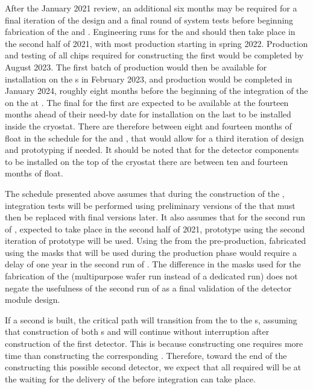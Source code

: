 After the January 2021 review, an additional six months may be 
required for a final iteration of the  design
and a final round of system tests before beginning fabrication
of the  and . Engineering runs
for the  and  should then take place in the
second half of 2021, with most production starting in
spring 2022. Production and testing of all chips required
for constructing the first   
would be completed by August 2023. The first batch of
production  would then be available for installation on
the s in February 2023, and production would be
completed in January 2024, roughly eight months before the 
beginning of the integration of the  on the
 at . The final  for the 
first  are expected to be available at the  
fourteen months ahead of their need-by date for installation on the 
last  to be installed inside the cryostat.
There are therefore between eight and fourteen months of float
in the schedule for the  and , that 
would allow for a third iteration of design and prototyping
if needed. It should be noted that for the detector components
to be installed on the top of the cryostat there are between
ten and fourteen months of float.

The schedule presented above assumes that during the
construction of the ,
integration tests will be performed using preliminary
versions of the  that must then be replaced
with final versions later. It also assumes that for the
second run of , expected to take place in the
second half of 2021, prototype  using the
second iteration of prototype  will be used.
Using the  from the pre-production, fabricated using
the masks that will be used during the production phase 
would require a delay of one year in the second run of
. The difference in the masks used for the
fabrication of the  (multipurpose wafer run instead 
of a dedicated run) does not negate the usefulness of
the second run of  as a final validation of
the   detector module design.

If a second    is built, the critical
path will transition from the 
to the s, assuming that construction
of both s and  will continue 
without interruption after construction of the first detector. 
This is because constructing one  requires 
more time than constructing the corresponding . Therefore,
toward the end of the constructing this possible second detector,
we expect that all required  will be at the
 waiting for the delivery of the  before
integration can take place.

